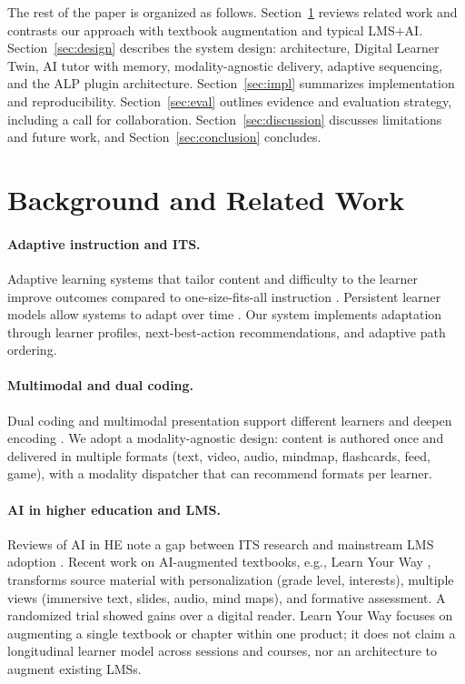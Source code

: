 \documentclass[10pt,twocolumn]{article}
\begin{document}
The rest of the paper is organized as follows. Section~\ref{sec:related} reviews related work and contrasts our approach with textbook augmentation and typical LMS+AI. Section~\ref{sec:design} describes the system design: architecture, Digital Learner Twin, AI tutor with memory, modality-agnostic delivery, adaptive sequencing, and the ALP plugin architecture. Section~\ref{sec:impl} summarizes implementation and reproducibility. Section~\ref{sec:eval} outlines evidence and evaluation strategy, including a call for collaboration. Section~\ref{sec:discussion} discusses limitations and future work, and Section~\ref{sec:conclusion} concludes.

\section{Background and Related Work}
\label{sec:related}

\paragraph{Adaptive instruction and ITS.}
Adaptive learning systems that tailor content and difficulty to the learner improve outcomes compared to one-size-fits-all instruction \cite{vanlehn2011,aleven2016}. Persistent learner models allow systems to adapt over time \cite{self1988,bull2016}. Our system implements adaptation through learner profiles, next-best-action recommendations, and adaptive path ordering.

\paragraph{Multimodal and dual coding.}
Dual coding and multimodal presentation support different learners and deepen encoding \cite{mayer2009,clark2016}. We adopt a modality-agnostic design: content is authored once and delivered in multiple formats (text, video, audio, mindmap, flashcards, feed, game), with a modality dispatcher that can recommend formats per learner.

\paragraph{AI in higher education and LMS.}
Reviews of AI in HE note a gap between ITS research and mainstream LMS adoption \cite{zawacki2019}. Recent work on AI-augmented textbooks, e.g., Learn Your Way \cite{learnyourway2025}, transforms source material with personalization (grade level, interests), multiple views (immersive text, slides, audio, mind maps), and formative assessment. A randomized trial showed gains over a digital reader. Learn Your Way focuses on augmenting a single textbook or chapter within one product; it does not claim a longitudinal learner model across sessions and courses, nor an architecture to augment existing LMSs.
\end{document}

